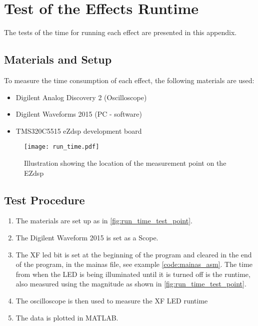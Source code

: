 \chapter{Test of the Effects Runtime}\label{app:effect_run_time}

The tests of the time for running each effect are presented in this appendix.

\section*{Materials and Setup}
To measure the time consumption of each effect, the following materials are used:
\begin{itemize}
\item Digilent Analog Discovery 2 (Oscilloscope)
\item Digilent Waveforms 2015 (PC - software)
\item TMS320C5515 eZdsp development board
\end{itemize}


\begin{figure}[htbp!]
	\centering
		\texttt{[image: run\_time.pdf]}
		\caption{Illustration showing the location of the measurement point on the EZdsp}
		\label{fig:run_time_test_point}
\end{figure}


\section*{Test Procedure}
\begin{enumerate}
\item The materials are set up as in \autoref{fig:run_time_test_point}.
\item The Digilent Waveform 2015 is set as a Scope.
\item  The XF led bit is set at the beginning of the program and cleared in the end of the program, in the mainas file, see example \autoref{code:mainas_asm}. The time from when the LED is being illuminated until it is turned off is the runtime, also measured using the magnitude as shown in \autoref{fig:run_time_test_point}. 
\item  The oscilloscope is then used to measure the XF LED runtime 
\item The data is plotted in MATLAB.
\end{enumerate}

